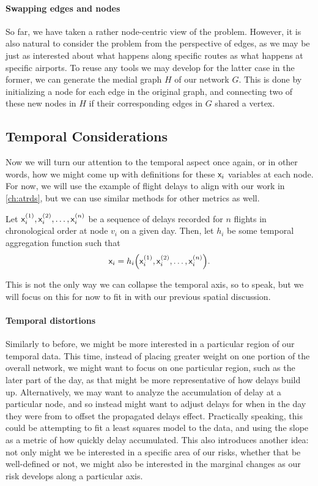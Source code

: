 \paragraph{Swapping edges and nodes} So far, we have taken a rather node-centric view of the problem. However, it is also natural to consider the problem from the perspective of edges, as we may be just as interested about what happens along specific routes as what happens at specific airports. To reuse any tools we may develop for the latter case in the former, we can generate the medial graph $H$ of our network $G$. This is done by initializing a node for each edge in the original graph, and connecting two of these new nodes in $H$ if their corresponding edges in $G$ shared a vertex.

\subsection{Temporal Considerations}

Now we will turn our attention to the temporal aspect once again, or in other words, how we might come up with definitions for these $\mathsf x_i$ variables at each node. For now, we will use the example of flight delays to align with our work in \cref{ch:atrds}, but we can use similar methods for other metrics as well.

\begin{example}
    Let $\mathsf x_i^{(1)}, \mathsf x_i^{(2)}, \ldots, \mathsf x_i^{(n)}$ be a sequence of delays recorded for $n$ flights in chronological order at node $v_i$ on a given day. Then, let $h_i$ be some temporal aggregation function such that \[\rx_i = h_i\pars*{\rx_i^{(1)},\rx_i^{(2)}, \ldots, \rx_i^{(n)}}.\]
\end{example}
This is not the only way we can collapse the temporal axis, so to speak, but we will focus on this for now to fit in with our previous spatial discussion.

\paragraph{Temporal distortions} Similarly to before, we might be more interested in a particular region of our temporal data. This time, instead of placing greater weight on one portion of the overall network, we might want to focus on one particular region, such as the later part of the day, as that might be more representative of how delays build up. Alternatively, we may want to analyze the accumulation of delay at a particular node, and so instead might want to adjust delays for when in the day they were from to offset the propagated delays effect. Practically speaking, this could be attempting to fit a least squares model to the data, and using the slope as a metric of how quickly delay accumulated. This also introduces another idea: not only might we be interested in a specific area of our risks, whether that be well-defined or not, we might also be interested in the marginal changes as our risk develops along a particular axis. 

